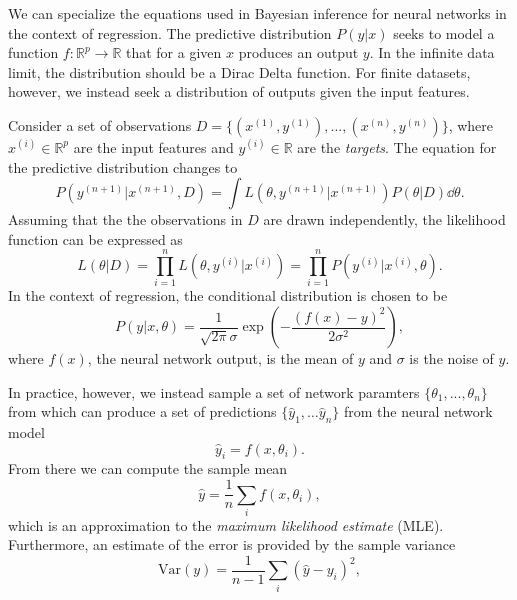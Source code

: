 We can specialize the equations used in Bayesian inference for neural networks in the context of regression.
The predictive distribution $P(y|x)$ seeks to model a function $f : \mathbb{R}^p \to \mathbb{R}$ that for a given $x$ produces an output $y$. In the infinite data limit, the distribution should be a Dirac Delta function. For finite datasets, however, we instead seek a distribution of outputs given the input features.

Consider a set of observations $D = \{(x^{(1)}, y^{(1)}), ..., (x^{(n)}, y^{(n)})\}$, where $x^{(i)} \in \mathbb{R}^p$ are the input features and $y^{(i)} \in \mathbb{R}$ are the \textit{targets}. The equation for the predictive distribution changes to
\begin{equation}
  P(y^{(n+1)}|x^{(n+1)}, D) = \int L(\theta, y^{(n+1)}|x^{(n+1)})P(\theta|D)\dd \theta.
\end{equation}
Assuming that the the observations in $D$ are drawn independently, the likelihood function can be expressed as
\begin{equation}
  L(\theta|D) = \prod_{i=1}^n L(\theta, y^{(i)}|x^{(i)}) = \prod_{i=1}^n P(y^{(i)}|x^{(i)}, \theta).
\end{equation}
In the context of regression, the conditional distribution is chosen to be
\begin{equation}
  P(y|x, \theta) = \frac{1}{\sqrt{2\pi}\sigma}\exp\left(-\frac{(f(x) - y)^2}{2\sigma^2}\right),
\end{equation}
where $f(x)$, the neural network output, is the mean of $y$ and $\sigma$ is the noise of $y$.

In practice, however, we instead sample a set of network paramters $\{\theta_1, ..., \theta_n\}$ from which can produce a set of predictions $\{\hat{y}_1,\ldots \hat{y}_n\}$ from the neural network model 
\begin{equation}
  \hat{y}_i = f(x, \theta_i).
\end{equation}
From there we can compute the sample mean
\begin{equation}
  \hat{y} = \frac{1}{n}\sum_i f(x, \theta_i),
\end{equation}
which is an approximation to the \textit{maximum likelihood estimate} (MLE). Furthermore, an estimate of the error is provided by the sample variance
\begin{equation}
  \text{Var} (y) = \frac{1}{n-1}\sum_i (\hat{y} - y_i)^2,
\end{equation}